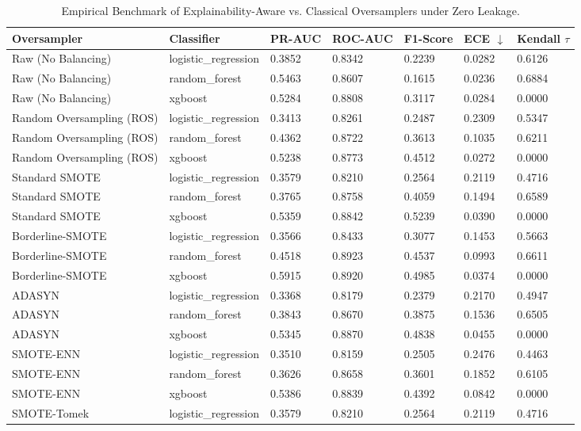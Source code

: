 \begin{table}[htbp]
\centering
\caption{Empirical Benchmark of Explainability-Aware vs. Classical Oversamplers under Zero Leakage.}
\label{tab:empirical_benchmarks}
\begin{tabular}{lllllll}
\toprule
Oversampler & Classifier & PR-AUC & ROC-AUC & F1-Score & ECE $\downarrow$ & Kendall $\tau$ \\
\midrule
Raw (No Balancing) & logistic_regression & 0.3852 & 0.8342 & 0.2239 & 0.0282 & 0.6126 \\
Raw (No Balancing) & random_forest & 0.5463 & 0.8607 & 0.1615 & 0.0236 & 0.6884 \\
Raw (No Balancing) & xgboost & 0.5284 & 0.8808 & 0.3117 & 0.0284 & 0.0000 \\
Random Oversampling (ROS) & logistic_regression & 0.3413 & 0.8261 & 0.2487 & 0.2309 & 0.5347 \\
Random Oversampling (ROS) & random_forest & 0.4362 & 0.8722 & 0.3613 & 0.1035 & 0.6211 \\
Random Oversampling (ROS) & xgboost & 0.5238 & 0.8773 & 0.4512 & 0.0272 & 0.0000 \\
Standard SMOTE & logistic_regression & 0.3579 & 0.8210 & 0.2564 & 0.2119 & 0.4716 \\
Standard SMOTE & random_forest & 0.3765 & 0.8758 & 0.4059 & 0.1494 & 0.6589 \\
Standard SMOTE & xgboost & 0.5359 & 0.8842 & 0.5239 & 0.0390 & 0.0000 \\
Borderline-SMOTE & logistic_regression & 0.3566 & 0.8433 & 0.3077 & 0.1453 & 0.5663 \\
Borderline-SMOTE & random_forest & 0.4518 & 0.8923 & 0.4537 & 0.0993 & 0.6611 \\
Borderline-SMOTE & xgboost & 0.5915 & 0.8920 & 0.4985 & 0.0374 & 0.0000 \\
ADASYN & logistic_regression & 0.3368 & 0.8179 & 0.2379 & 0.2170 & 0.4947 \\
ADASYN & random_forest & 0.3843 & 0.8670 & 0.3875 & 0.1536 & 0.6505 \\
ADASYN & xgboost & 0.5345 & 0.8870 & 0.4838 & 0.0455 & 0.0000 \\
SMOTE-ENN & logistic_regression & 0.3510 & 0.8159 & 0.2505 & 0.2476 & 0.4463 \\
SMOTE-ENN & random_forest & 0.3626 & 0.8658 & 0.3601 & 0.1852 & 0.6105 \\
SMOTE-ENN & xgboost & 0.5386 & 0.8839 & 0.4392 & 0.0842 & 0.0000 \\
SMOTE-Tomek & logistic_regression & 0.3579 & 0.8210 & 0.2564 & 0.2119 & 0.4716 \\

\end{tabular}
\end{table}
